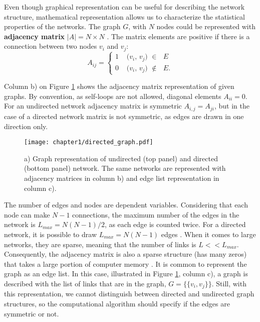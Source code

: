 Even though graphical representation can be useful for describing the network structure, mathematical representation allows us to characterize the statistical properties of the networks. The graph $G$, with $N$ nodes could be represented with \textbf{adjacency matrix} $|A| = N \times N$ \cite{boccaletti2006complex}. The matrix elements are positive if there is a connection between two nodes $v_i$ and $v_j$:
\begin{equation}
A_{ij} =
\begin{cases}
1 & \text{ ($v_i$, $v_j$) $\in$ $E$}\\
0 & \text{ ($v_i$, $v_j$) $\notin$ $E$}.
\end{cases}       
\end{equation}

Column b) on Figure \ref{fig:graph_dir} shows the adjacency matrix representation of given graphs. By convention, as self-loops are not allowed, diagonal elements $A_{ii}=0$. For an undirected network adjacency matrix is symmetric $A_{i,j}=A_{ji}$, but in the case of a directed network matrix is not symmetric, as edges are drawn in one direction only.  

\begin{figure}[h]
	\centering
	\texttt{[image: chapter1/directed\_graph.pdf]} 
	\caption[Graph, matrix and edge list representations.]{a) Graph representation of undirected (top panel) and directed (bottom panel) network. The same networks are represented with adjacency matrices in column b) and edge list representation in column c).}
	\label{fig:graph_dir}
\end{figure}

The number of edges and nodes are dependent variables. Considering that each node can make $N-1$ connections, the maximum number of the edges in the network is $L_{max}=N(N-1)/2$, as each edge is counted twice. For a directed network, it is possible to draw $L_{max}=N(N-1)$ edges \cite{caldarelli2007scalefree}. When it comes to large networks, they are sparse, meaning that the number of links is $L<<L_{max}$. Consequently, the adjacency matrix is also a sparse structure (has many zeros) that takes a large portion of computer memory \cite{barabasi2016network}. 
It is common to represent the graph as an edge list. In this case, illustrated in Figure \ref{fig:graph_dir}, column c), a graph is described with the list of links that are in the graph, $G = \{ \{v_i,v_j\}\}$. Still, with this representation, we cannot distinguish between directed and undirected graph structures, so the computational algorithm should specify if the edges are symmetric or not.  

